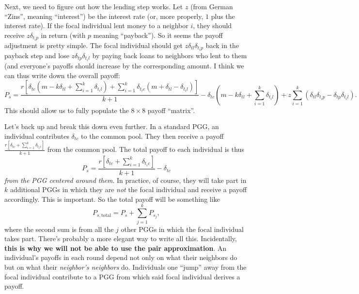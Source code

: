 \documentclass[14pt, a4paper, justified]{article}
\begin{document}
Next, we need to figure out how the lending step works.
Let $z$ (from German ``Zins'', meaning ``interest'') be the interest rate (or, more properly, $1$ plus the interest rate).
If the focal individual lent money to a neighbor $i$, they should receive $z \delta_{t_i p}$ in return (with $p$ meaning ``payback'').
So it seems the payoff adjustment is pretty simple.
The focal individual should get $z\delta_{tl} \delta_{t_i p}$ back in the payback step and lose $z \delta_{tp} \delta_{t_i l}$ by paying back loans to neighbors who lent to them (and everyone's payoffs should increase by the corresponding amount.
I think we can thus write down the overall payoff:
\begin{equation}
    P_s = \frac{r[\delta_{tc}(m - k\delta_{tl} + \sum_{i=1}^k \delta_{t_i l}) + \sum_{i=1}^k \delta_{t_i c} (m + \delta_{tl} - \delta_{t_i l})]}{k+1} - \delta_{tc}(m - k\delta_{tl} + \sum_{i=1}^k \delta_{t_i l}) + z\sum_{i=1}^k (\delta_{tl} \delta_{t_i p} - \delta_{tp} \delta_{t_i l}).
\end{equation}
This should allow us to fully populate the $8 \times 8$ payoff ``matrix''.

Let's back up and break this down even further.
In a standard PGG, an individual contributes $\delta_{tc}$ to the common pool.
They then receive a payoff $\frac{r[\delta_{tc} + \sum_{i=1}^k \delta_{t_i c}]}{k+1}$ from the common pool.
The total payoff to each individual is thus
\begin{equation}
    P_s = \frac{r[\delta_{tc} + \sum_{i=1}^k \delta_{t_i c}]}{k+1} - \delta_{tc}
\end{equation}
\emph{from the PGG centered around them}.
In practice, of course, they will take part in $k$ additional PGGs in which they are \emph{not} the focal individual and receive a payoff accordingly.
This is important.
So the total payoff will be something like
\begin{equation}
    P_{s, \mathrm{total}} = P_s + \sum_{j=1}^k P_{s_j},
\end{equation}
where the second sum is from all the $j$ other PGGs in which the focal individual takes part.
There's probably a more elegant way to write all this.
Incidentally, \textbf{this is why we will not be able to use the pair approximation}.
An individual's payoffs in each round depend not only on what their neighbors do but on what their \emph{neighbor's neighbors} do.
Individuals one ``jump'' away from the focal individual contribute to a PGG from which said focal individual derives a payoff.
\end{document}
